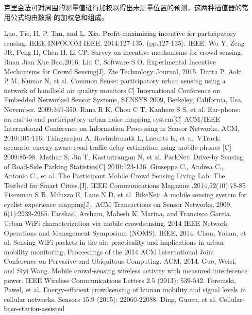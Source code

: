 \documentclass[UTF8]{ctexart}
\begin{document}
克里金法可对周围的测量值进行加权以得出未测量位置的预测，这两种插值器的常用公式均由数据
的加权总和组成。

\begin{thebibliography}{99}
   Luo, Tie, H. P. Tan, and L. Xia. Profit-maximizing incentive
  for participatory sensing. IEEE INFOCOM IEEE, 2014:127-135.
  (pp.127-135). IEEE.
   Wu Y, Zeng JR, Peng H, Chen H, Li CP. Survey on incentive
  mechanisms for crowd sensing. Ruan Jian Xue Bao.2016.
   Liu C, Software S O. Experimental Incentive Mechanisms for
  Crowd Sensing[J]. Zte Technology Journal, 2015.
   Dutta P, Aoki P M, Kumar N, et al. Common Sense: participatory
  urban sensing using a network of handheld air quality monitors[C]
  International Conference on Embedded Networked Sensor Systems, SENSYS 2009,
  Berkeley, California, Usa, November. 2009:349-350.
   Rana R K, Chou C T, Kanhere S S, et al. Ear-phone: an
  end-to-end participatory urban noise mapping system[C] ACM/IEEE
  International Conference on Information Processing in Sensor Networks.
  ACM, 2010:105-116.
   Thiagarajan A, Ravindranath L, Lacurts K, et al. VTrack:
  accurate, energy-aware road traffic delay estimation using mobile phones
  [C] 2009:85-98.
   Mathur S, Jin T, Kasturirangan N, et al. ParkNet: Drive-by
  Sensing of Road-Side Parking Statistics[C] 2010:123-136.
  	Giuseppe C., Andrea C., Antonio C., et al. The Participant
  Mobile Crowd Sensing Living Lab: The Testbed for Smart Cities.[J]. IEEE
  Communications Magazine ,2014,52(10):78-85
   Eisenman S B, Miluzzo E, Lane N D, et al. BikeNet: A mobile
  sensing system for cyclist experience mapping[J]. ACM Transactions on
  Sensor Networks, 2009, 6(1):2939-2965.
   Farshad, Arsham, Mahesh K. Marina, and Francisco Garcia.
  Urban WiFi characterization via mobile crowdsensing. 2014 IEEE Network
  Operations and Management Symposium (NOMS). IEEE, 2014.
   Chon, Yohan, et al. Sensing WiFi packets in the air:
  practicality and implications in urban mobility monitoring. Proceedings
  of the 2014 ACM International Joint Conference on Pervasive and Ubiquitous
  Computing. ACM, 2014.
   Guo, Weisi, and Siyi Wang. Mobile crowd-sensing wireless
  activity with measured interference power. IEEE Wireless Communications
  Letters 2.5 (2013): 539-542.
   Foremski, Paweł, et al. Energy-efficient crowdsensing of human
  mobility and signal levels in cellular networks. Sensors 15.9 (2015):
  22060-22088.
   Ding, Guoru, et al. Cellular-base-station-assisted

\end{thebibliography}
\end{document}
